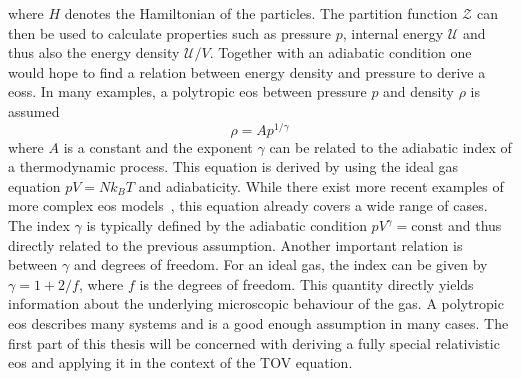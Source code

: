 where $H$ denotes the Hamiltonian of the particles.
The partition function $\mathcal{Z}$ can then be used to calculate properties such as pressure $p$, internal energy $\mathcal{U}$ and thus also the energy density $\mathcal{U}/V$.
Together with an adiabatic condition one would hope to find a relation between energy density and pressure to derive a \acp{eos}.
In many examples, a polytropic \ac{eos} between pressure $p$ and density $\rho$ is assumed
\begin{equation}
	\rho = Ap^{1/\gamma}
	\label{eq:01-Intr-Poly-EOS}
\end{equation}
where $A$ is a constant and the exponent $\gamma$ can be related to the adiabatic index of a thermodynamic process.
This equation is derived by using the ideal gas equation $pV=Nk_B T$ and adiabaticity.
While there exist more recent examples of more complex \ac{eos} models~\cite{hummerEquationStateStellar1988}, this equation already covers a wide range of cases.
The index $\gamma$ is typically defined by the adiabatic condition $pV^\gamma=\text{const}$ and thus directly related to the previous assumption.
Another important relation is between $\gamma$ and degrees of freedom.
For an ideal gas, the index can be given by $\gamma=1+2/f$, where $f$ is the degrees of freedom.
This quantity directly yields information about the underlying microscopic behaviour of the gas.
A polytropic \ac{eos} describes many systems and is a good enough assumption in many cases.
The first part of this thesis will be concerned with deriving a fully special relativistic \ac{eos} and applying it in the context of the \ac{TOV} equation.